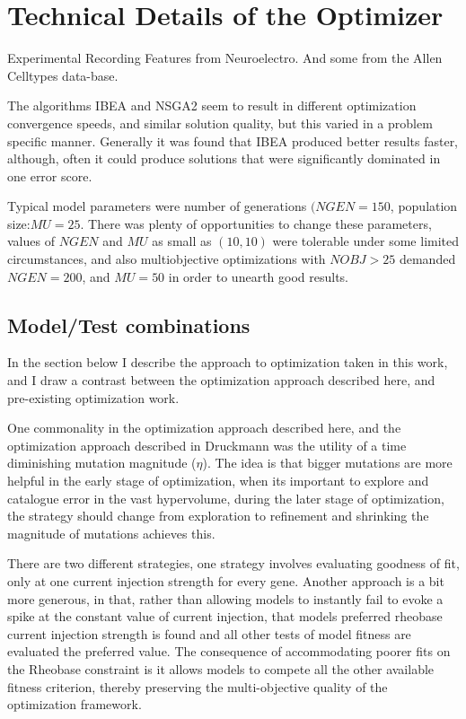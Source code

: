 \section*{Technical Details of the Optimizer}
Experimental Recording Features from Neuroelectro. And some from the Allen Celltypes data-base.


The algorithms IBEA and NSGA2 seem to result in different optimization convergence speeds, and similar solution quality, but this varied in a problem specific manner. Generally it was found that IBEA produced better results faster, although, often it could produce solutions that were significantly dominated in one error score.

Typical model parameters were number of generations $(NGEN=150$, population size:$MU=25$. There was plenty of opportunities to change these parameters,  values of $NGEN$ and $MU$ as small as $(10,10)$ were tolerable under some limited circumstances, and also multiobjective optimizations with $NOBJ>25$ demanded $NGEN=200$, and $MU=50$ in order to unearth good results.


\subsection{Model/Test combinations}

In the section below I describe the approach to optimization taken in this work, and I draw a contrast between the optimization approach described here, and pre-existing optimization work. 

One commonality in the optimization approach described here, and the optimization approach described in Druckmann \cite{druckmann2007novel} was the utility of a time diminishing mutation magnitude ($\eta$). The idea is that bigger mutations are more helpful in the early stage of optimization, when its important to explore and catalogue error in the vast hypervolume, during the later stage of optimization, the strategy should change from exploration to refinement and shrinking the magnitude of mutations achieves this. %

There are two different strategies, one strategy involves evaluating goodness of fit, only at one current injection strength for every gene. Another approach is a bit more generous, in that, rather than allowing models to instantly fail to evoke a spike at the constant value of current injection, that models preferred rheobase current injection strength is found  and all other tests of model fitness are evaluated the preferred value. The consequence of accommodating poorer fits on the Rheobase constraint is it allows models to compete all the other available fitness criterion, thereby preserving the multi-objective quality of the optimization framework.

